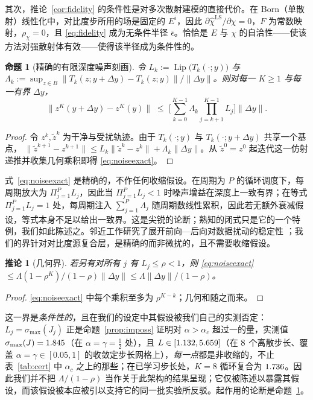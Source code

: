 \documentclass[UTF8,a4paper,11pt]{ctexart}
\newcommand{\norm}[1]{\lVert #1 \rVert}
\newcommand{\numv}[1]{#1}
\newtheorem{Proposition}{命题}[section]
\newtheorem{Corollary}{推论}[section]
\begin{document}
其次，推论~\ref{cor:fidelity} 的条件性是对多次散射建模的直接代价。在 Born（单散射）线性化中，对比度步所用的场是固定的 $E^i$，因此 $\partial\hat\chi^{\mathrm{LS}}/\partial\chi=0$，$F$ 为常数映射，$\rho_\chi=0$，且 \eqref{eq:fidelity} 成为无条件半径 $\bar\epsilon$。恰恰是 $E$ 与 $\chi$ 的自洽性——使该方法对强散射体有效——使得该半径成为条件性的。

\begin{Proposition}[精确的有限深度噪声刻画]\label{prop:noise}
令 $L_k:=\operatorname{Lip}\big(T_k(\cdot;y)\big)$ 与
$\Lambda_k:=\sup_{z\in B}\norm{T_k(z;y+\Delta y)-T_k(z;y)}/\norm{\Delta y}$。则对每一 $K\ge1$ 与每一有界 $\Delta y$，
\begin{equation}\label{eq:noiseexact}
\norm{z^{K}(y+\Delta y)-z^{K}(y)}
\;\le\;\Big[\sum_{k=0}^{K-1}\Lambda_k\!\!\prod_{j=k+1}^{K-1}\!\!L_j\Big]\norm{\Delta y}.
\end{equation}
\end{Proposition}
\begin{proof}
令 $z^{k},\tilde z^{k}$ 为干净与受扰轨迹。由于 $T_k(\cdot;y)$ 与 $T_k(\cdot;y+\Delta y)$ 共享一个基点，
$\norm{\tilde z^{k+1}-z^{k+1}}
\le L_k\norm{\tilde z^{k}-z^{k}}+\Lambda_k\norm{\Delta y}$。从 $\tilde z^{0}=z^{0}$ 起迭代这一仿射递推并收集几何乘积即得 \eqref{eq:noiseexact}。
\end{proof}
式~\eqref{eq:noiseexact} 是精确的，不作任何收缩假设。在周期为 $P$ 的循环调度下，每周期放大为 $\Pi_{j=1}^{P}L_j$，因此当 $\Pi_{j=1}^{P}L_j<1$ 时噪声增益在深度上一致有界；在等式 $\Pi_{j=1}^{P}L_j=1$ 处，每周期注入 $\sum_{j=1}^{P}\Lambda_j$ 随周期数线性累积，因此若无额外衰减假设，等式本身不足以给出一致界。这是尖锐的论断；熟知的闭式只是它的一个特例，我们如此陈述之。邻近工作研究了展开前向—后向对数据扰动的稳定性 \cite{devalle2023}；我们的界针对对比度源复合层，是精确的而非微扰的，且不需要收缩假设。

\begin{Corollary}[几何界]\label{cor:noisegeo}
若另有对所有 $j$ 有 $L_j\le\rho<1$，则
\eqref{eq:noiseexact} $\le\Lambda(1-\rho^{K})/(1-\rho)\norm{\Delta y}
\le\Lambda\norm{\Delta y}/(1-\rho)$。
\end{Corollary}
\begin{proof}
\eqref{eq:noiseexact} 中每个乘积至多为 $\rho^{K-k}$；几何和随之而来。
\end{proof}
这一界是\emph{条件性的}，且在我们的设定中其假设被我们自己的实测否定：$L_j=\sigma_{\max}(J_j)$ 正是命题~\ref{prop:imposs} 证明对 $\alpha>\alpha_c$ 超过一的量，实测值
$\sigma_{\max}(J)=\numv{\NumPhysSigma}$（在 $\alpha=\gamma=\tfrac12$ 处），且 $L\in[\numv{\NumSigMin},\numv{\NumSigMax}]$（在 $\numv{\NumAlphaSweepN}$ 个离散步长、覆盖 $\alpha=\gamma\in[0.05,1]$ 的收敛定步长网格上），\emph{每一点}都是非收缩的，不止表~\ref{tab:cert} 中 $\alpha_c$ 之上的那些；在已学习步长处，$K{=}8$ 循环复合为 $\numv{\NumSigCompCons}$。因此我们并不把 $\Lambda/(1-\rho)$ 当作关于此架构的结果呈现；它仅被陈述以暴露其假设，而该假设被本应被引以支持它的同一批实验所反驳。起作用的论断是命题~\ref{prop:noise}。
\end{document}
